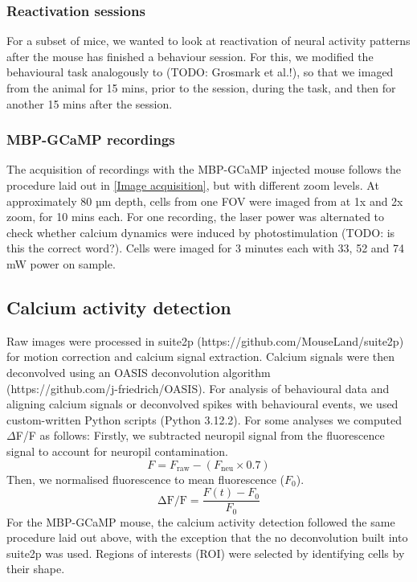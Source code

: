 \subsubsection{Reactivation sessions}
For a subset of mice, we wanted to look at reactivation of neural activity patterns after the mouse has finished a behaviour session.
For this, we modified the behavioural task analogously to (TODO: Grosmark et al.!), so that we imaged from the animal for 15 mins, prior to the session, during the task, and then for another 15 mins after the session.
\subsubsection{MBP-GCaMP recordings}
The acquisition of recordings with the MBP-GCaMP injected mouse follows the procedure laid out in \ref{Image acquisition}, but with different zoom levels.
At approximately 80 µm depth, cells from one FOV were imaged from at 1x and 2x zoom, for 10 mins each.
For one recording, the laser power was alternated to check whether calcium dynamics were induced by photostimulation (TODO: is this the correct word?). Cells were imaged for 3 minutes each with 33, 52 and 74 mW power on sample.
\subsection{Calcium activity detection}
Raw images were processed in suite2p (https://github.com/MouseLand/suite2p) for motion correction and calcium signal extraction. Calcium signals were then deconvolved using an OASIS deconvolution algorithm\\ (https://github.com/j-friedrich/OASIS).
For analysis of behavioural data and aligning calcium signals or deconvolved spikes with behavioural events, we used custom-written Python scripts (Python 3.12.2).
For some analyses we computed \(\Delta \)F/F as follows:
Firstly, we subtracted neuropil signal from the fluorescence signal to account for neuropil contamination.
\begin{equation}
    F = F_{\text{raw}} - (F_{\text{neu}} \times 0.7)
    \label{eq:f}
\end{equation}
Then, we normalised fluorescence to mean fluorescence ($F_0$).
\begin{equation}
    \text{ΔF/F} = \frac{F(t) - F_0}{F_0}
    \label{eq:dFF}
\end{equation}
For the MBP-GCaMP mouse, the calcium activity detection followed the same procedure laid out above, with the exception that the no deconvolution built into suite2p was used. Regions of interests (ROI) were selected by identifying cells by their shape.
